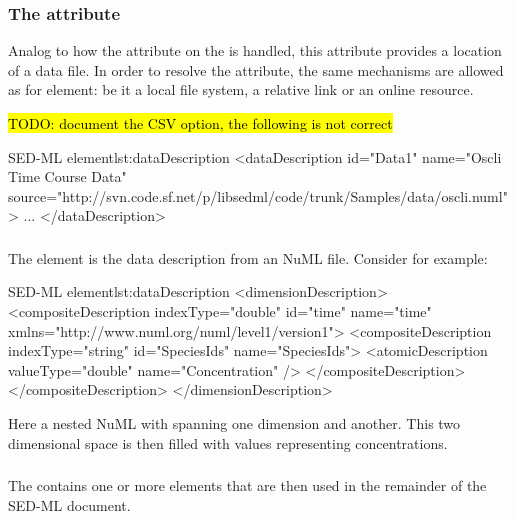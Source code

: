 \subsubsection{The  attribute}
\label{sec:sedsource}
Analog to how the  attribute on the \SedModel is handled, this attribute provides a location of a data file. In order to resolve the  attribute, the same mechanisms are allowed as for \SedModel element: be it a local file system, a relative link or an online resource.

\hl{TODO: document the CSV option, the following is not correct}

\begin{myXmlLst}{SED-ML  element}{lst:dataDescription}
   <dataDescription id="Data1" name="Oscli Time Course Data" 
     source="http://svn.code.sf.net/p/libsedml/code/trunk/Samples/data/oscli.numl" >
     ...
    </dataDescription>
\end{myXmlLst} 


\subsubsection{}
\label{class:dimensionDescription}

The  element is the data description from an NuML file. Consider for example:

\begin{myXmlLst}{SED-ML  element}{lst:dataDescription}
    <dimensionDescription>
        <compositeDescription indexType="double" id="time" name="time" 
          xmlns="http://www.numl.org/numl/level1/version1">
        <compositeDescription indexType="string" id="SpeciesIds" name="SpeciesIds">
            <atomicDescription valueType="double" name="Concentration" />
        </compositeDescription>
        </compositeDescription>
    </dimensionDescription>
\end{myXmlLst} 

Here a nested NuML  with  spanning one dimension and  another. This two dimensional space is then filled with  values representing concentrations.


\subsubsection{}
\label{class:listOfDataSources}
The  contains one or more \SedDataSource elements that are then used in the remainder of the SED-ML document.


